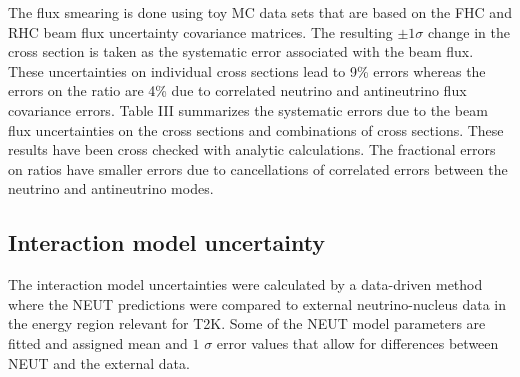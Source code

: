 The flux smearing is done using toy MC data sets that are
based on the FHC and RHC beam flux uncertainty covariance matrices. 
The resulting $\pm1\sigma$ change in the cross section is taken as
the systematic error associated with the beam flux. 
These uncertainties on individual cross sections
lead to 9\% errors whereas the errors on the ratio are 4\%
due to correlated neutrino and antineutrino flux covariance errors. 
Table III summarizes the systematic errors due to the beam flux 
uncertainties on the cross sections and combinations of cross sections.
These results have been cross checked with analytic calculations.
The fractional errors on ratios have smaller errors due to
cancellations of correlated errors between the
neutrino and antineutrino modes.
\begin{table}
\caption{
\label{tab:BeamFluxSummary}
Summary table for one standard deviation errors due to beam flux uncertainties. (fractionl errors in $\%$)
}
\end{table}


\subsection{Interaction model uncertainty}

The interaction model uncertainties were calculated by a data-driven method \citep{int-model} 
where the NEUT predictions were compared 
to external neutrino-nucleus data in the energy region relevant for T2K. 
Some of the NEUT model parameters are fitted and 
assigned mean and $1$ $\sigma$ error values that allow
for differences between NEUT 
and the external data. \\




